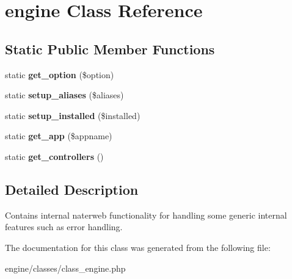 \hypertarget{classengine}{\section{engine Class Reference}
\label{classengine}
}
\subsection*{Static Public Member Functions}
\begin{DoxyCompactItemize}
\item 
\hypertarget{classengine_a06db5cb5595cf6e64e3cda77e0c0b4bc}{static {\bfseries get\-\_\-option} (\$option)}\label{classengine_a06db5cb5595cf6e64e3cda77e0c0b4bc}

\item 
\hypertarget{classengine_ace33afdcef3b89de63cd75f2ff9a8504}{static {\bfseries setup\-\_\-aliases} (\$aliases)}\label{classengine_ace33afdcef3b89de63cd75f2ff9a8504}

\item 
\hypertarget{classengine_a996a462ed8500d177c247054cc35233e}{static {\bfseries setup\-\_\-installed} (\$installed)}\label{classengine_a996a462ed8500d177c247054cc35233e}

\item 
\hypertarget{classengine_abf0d79d4def642c5c8ae8937b1ce1106}{static {\bfseries get\-\_\-app} (\$appname)}\label{classengine_abf0d79d4def642c5c8ae8937b1ce1106}

\item 
\hypertarget{classengine_af3e9771513d21673715e1a7d396e0c11}{static {\bfseries get\-\_\-controllers} ()}\label{classengine_af3e9771513d21673715e1a7d396e0c11}

\end{DoxyCompactItemize}


\subsection{Detailed Description}
Contains internal naterweb functionality for handling some generic internal features such as error handling. 

The documentation for this class was generated from the following file\-:\begin{DoxyCompactItemize}
\item 
engine/classes/class\-\_\-engine.\-php\end{DoxyCompactItemize}
